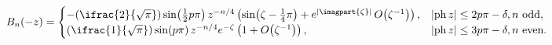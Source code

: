\[\mathop{B_{n}\/}\nolimits\!\left(-z\right)=\begin{cases}-(\ifrac{2}{\sqrt{\pi}%
})\mathop{\sin\/}\nolimits\!\left(\tfrac{1}{2}p\pi\right)z^{-n/4}\left(\mathop%
{\sin\/}\nolimits\!\left(\zeta-\tfrac{1}{4}\pi\right)+e^{\left|\imagpart{\zeta%
}\right|}\mathop{O\/}\nolimits\!\left(\zeta^{-1}\right)\right),&\left|\mathop{%
\mathrm{ph}\/}\nolimits z\right|\leq 2p\pi-\delta,n\text{ odd},\\
(\ifrac{1}{\sqrt{\pi}})\mathop{\sin\/}\nolimits\!\left(p\pi\right)z^{-n/4}e^{-%
\zeta}\left(1+\mathop{O\/}\nolimits\!\left(\zeta^{-1}\right)\right),&\left|%
\mathop{\mathrm{ph}\/}\nolimits z\right|\leq 3p\pi-\delta,n\text{ even}.\end{cases}\]